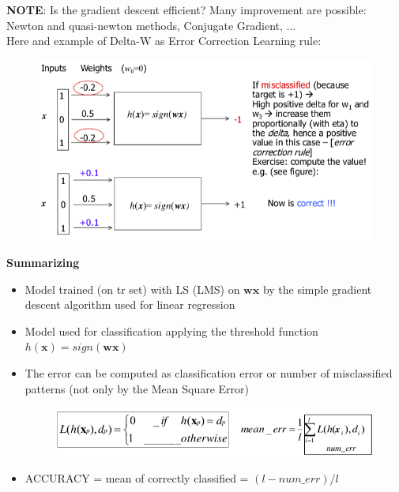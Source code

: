 \documentclass[../main.tex]{subfiles}
\begin{document}
\textbf{NOTE}: Is the gradient descent efficient? Many improvement are possible: Newton and quasi-newton methods, Conjugate Gradient, ...\\

Here and example of Delta-W as Error Correction Learning rule:
\begin{figure}[H]
    \centering
    \includegraphics[scale = 0.4]{lectures/2_linear_model/2_e_g_correction_rule.png}
\end{figure}

\noindent \textbf{Summarizing}\\
\begin{itemize}
    \item Model trained (on tr set) with LS (LMS) on $\mathbf{wx}$ by the simple gradient descent algorithm used for linear regression
    
    \item Model used for classification applying the threshold function $h(\mathbf{x}) = sign(\mathbf{wx})$
    
    \item The error can be computed as classification error or number of misclassified patterns (not only by the Mean Square Error)
    \begin{figure}[H]
        \centering
        \includegraphics[scale = 0.4]{lectures/2_linear_model/2_summarizing.png}
    \end{figure}

    \item ACCURACY = mean of correctly classified = $(l-num\_err)/l$
\end{itemize}
\end{document}
